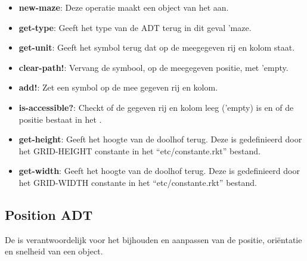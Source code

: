 \begin{itemize}
	\item \textbf{new-maze}: Deze operatie maakt een object van het \texttt{} aan.
	\item \textbf{get-type}: Geeft het type van de ADT terug in dit geval 'maze.
	\item \textbf{get-unit}: Geeft het symbol terug dat op de meegegeven rij en kolom staat.
	\item \textbf{clear-path!}: Vervang de symbool, op de meegegeven positie, met 'empty.
	\item \textbf{add!}: Zet een symbol op de mee gegeven rij en kolom.
	\item \textbf{is-accessible?}: Checkt of de gegeven rij en kolom leeg ('empty) is en of de positie bestaat in het \texttt{}.
	\item \textbf{get-height}: Geeft het hoogte van de doolhof terug.
		Deze is gedefinieerd door het GRID-HEIGHT constante in het ``etc/constante.rkt'' bestand.
	\item \textbf{get-width}: Geeft het hoogte van de doolhof terug.
		Deze is gedefinieerd door het GRID-WIDTH constante in het ``etc/constante.rkt'' bestand.
\end{itemize}

\subsection{Position ADT}
\label{section:positie}

De \texttt{} is verantwoordelijk voor het bijhouden en aanpassen van de positie, oriëntatie en snelheid van een object.

